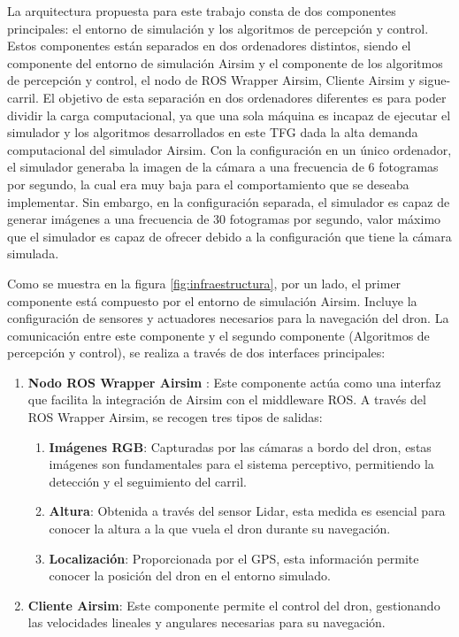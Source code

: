 La arquitectura propuesta para este trabajo consta de dos componentes principales: el entorno de simulación  y los algoritmos de percepción y control. Estos componentes 
están separados en dos ordenadores distintos, siendo el componente del entorno de simulación Airsim y  el componente de los algoritmos de percepción y control, el nodo de ROS Wrapper 
Airsim, Cliente Airsim y sigue-carril. 
El objetivo de esta separación en dos ordenadores diferentes es para poder dividir la carga computacional, ya que una sola máquina es incapaz de ejecutar el simulador y los algoritmos 
desarrollados en este TFG dada la alta demanda computacional del simulador Airsim. Con la configuración en un único ordenador, el simulador generaba la imagen de la cámara a una frecuencia de 6 fotogramas por segundo, la cual era muy baja para el comportamiento que se 
deseaba implementar. Sin embargo, en la configuración separada, el simulador es capaz de generar imágenes a una frecuencia de 30 fotogramas por segundo, valor máximo que el simulador es 
capaz de ofrecer debido a la configuración que tiene la cámara simulada.

Como se muestra en la figura \ref{fig:infraestructura}, por un lado, el primer componente está compuesto por el entorno de simulación Airsim. Incluye la configuración de sensores y actuadores necesarios 
para la navegación del dron. La comunicación entre este componente y el segundo componente (Algoritmos de percepción y control), se realiza a través de dos interfaces principales: 

\begin{enumerate}
  \item \textbf{Nodo ROS Wrapper Airsim }: Este componente actúa como una interfaz que facilita la integración de Airsim con el middleware ROS. A través del ROS Wrapper Airsim, 
  se recogen tres tipos de salidas: 
    \begin{enumerate}
      \item \textbf{Imágenes RGB}: Capturadas por las cámaras a bordo del dron, estas imágenes son fundamentales para el sistema perceptivo, permitiendo la detección y el 
      seguimiento del carril.
      \item \textbf{Altura}: Obtenida a través del sensor Lidar, esta medida es esencial para conocer la altura a la que vuela el dron durante su navegación. 
      \item \textbf{Localización}: Proporcionada por el GPS, esta información permite conocer la posición del dron en el entorno simulado. 
    \end{enumerate}

  \item \textbf{Cliente Airsim}: Este componente permite el control del dron, gestionando las velocidades lineales y angulares necesarias para su navegación. 
\end{enumerate}

